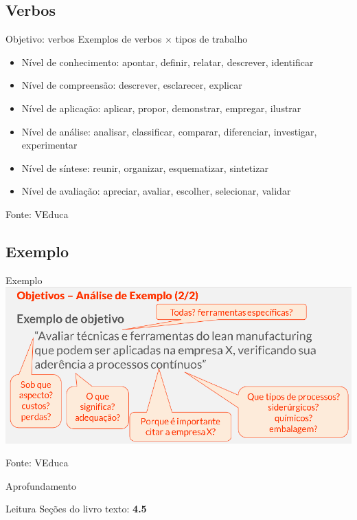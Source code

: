 \documentclass{beamer}
\begin{document}
\subsection{Verbos}

\begin{frame}{Objetivo: verbos}
  Exemplos de verbos $\times$ tipos de trabalho
  \begin{itemize}
  \item Nível de conhecimento: apontar, definir, relatar, descrever,
    identificar
  \item Nível de compreensão: descrever, esclarecer, explicar
  \item Nível de aplicação: aplicar, propor, demonstrar, empregar, ilustrar
  \item Nível de análise: analisar, classificar, comparar,
    diferenciar, investigar, experimentar
  \item Nível de síntese: reunir, organizar, esquematizar, sintetizar
  \item Nível de avaliação: apreciar, avaliar, escolher, selecionar, validar
  \end{itemize}

  Fonte: VEduca
\end{frame}

\subsection{Exemplo}

\begin{frame}{Exemplo}
  \includegraphics[width=1.15\textwidth]{ProjetoI/objetivo-verbos}

  Fonte: VEduca
\end{frame}

\begin{frame}{Aprofundamento}
  \begin{block}{Leitura}
    Seções do livro texto: {\bf 4.5}
  \end{block}
\end{frame}
\end{document}
